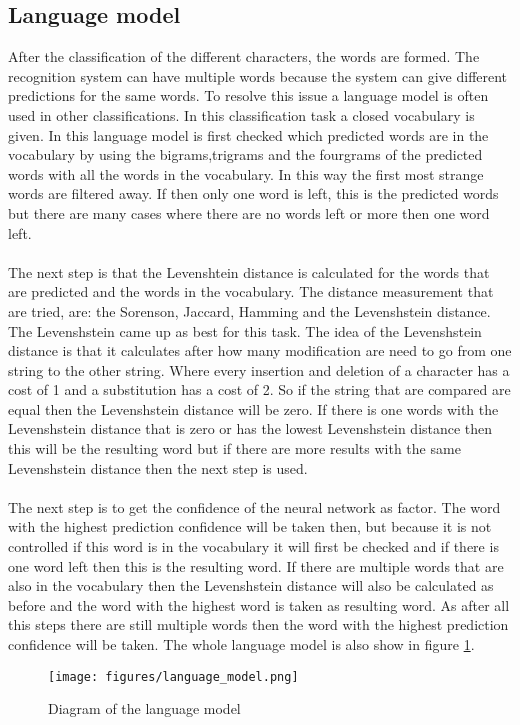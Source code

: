 \subsection{Language model}
After the classification of the different characters, the words are formed. The recognition system can have multiple words because the system can give different predictions for the same words. To resolve this issue a language model is often used in other classifications. In this classification task a closed vocabulary is given. In this language model is first checked which predicted words are in the vocabulary by using the bigrams,trigrams and the fourgrams of the predicted words with all the words in the vocabulary. In this way the first most strange words are filtered away. If then only one word is left, this is the predicted words but there are many cases where there are no words left or more then one word left.\\\\
The next step is that the Levenshtein distance is calculated for the words that are predicted and the words in the vocabulary. The distance measurement that are tried, are: the Sorenson, Jaccard, Hamming and the Levenshstein distance. The Levenshstein came up as best for this task. The idea of the Levenshstein distance is that it calculates after how many modification are need to go from one string to the other string.  Where every insertion and deletion of a character has a cost of 1 and a substitution has a cost of 2. So if the string that are compared are equal then the Levenshstein distance will be zero.  If there is one words with the Levenshstein distance that is zero or has the lowest Levenshstein distance then this will be the resulting word but if there are more results with the same Levenshstein distance then the next step is used.\\\\
The next step is to get the confidence of the neural network as factor. The word with the highest prediction confidence will be taken then, but because it is not controlled if this word is in the vocabulary it will first be checked and if there is one word left then this is the resulting word. If there are multiple words that are also in the vocabulary then the Levenshstein distance will also be calculated as before and the word with the highest word is taken as resulting word. As after all this steps there are still multiple words then the word with the highest prediction confidence will be taken. The whole language model is also show in figure \ref{Fig:languagemodel}.
\begin{figure}
\centering
\texttt{[image: figures/language\_model.png]}
\caption{Diagram of the language model}
\label{Fig:languagemodel}
\end{figure}